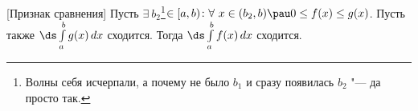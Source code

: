 [Признак сравнения]
    Пусть $\exists\  b_2$\footnote{Волны себя исчерпали, а почему не было $b_1$ и сразу появилась $b_2$ "--- да просто так.}$\in[a,b)\colon
    \forall\  x\in(b_2,b)\pau 0\leq f(x)\leq g(x)$. Пусть также $\ds\int\limits_a^bg(x)\,dx$ сходится. Тогда
    $\ds\int\limits_a^bf(x)\,dx$ сходится. 
    